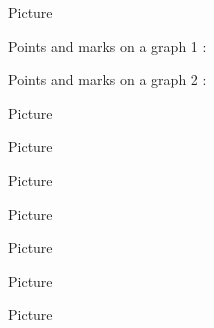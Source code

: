 Picture 
\begin{center}

\end{center}


Points and marks on a graph 1 :

\begin{center}

\end{center}


Points and marks on a graph 2 :

\begin{center}

\end{center}


\begin{center}

\end{center}



Picture 
\begin{center}
   
\end{center}



Picture 
\begin{center}

\end{center}


Picture 
\begin{center}
   
\end{center}


Picture 
\begin{center}
   
\end{center}


Picture 
\begin{center}
   
\end{center}



Picture 
\begin{center}
   
\end{center}
   

Picture 
\begin{center}
   
\end{center}
   
